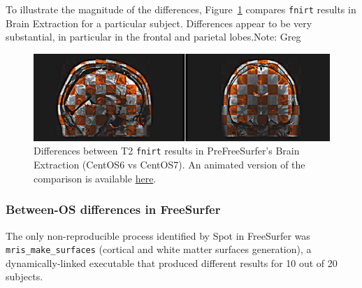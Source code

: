 \documentclass[a4paper,num-refs]{oup-contemporary}
\newcommand{\note}[2]{\color{blue}Note: #1\color{black}}
\newcommand{\toolname}[0]{Spot\xspace}
\newcommand{\fnirt}[0]{\texttt{fnirt}\xspace}
\begin{document}
To illustrate the magnitude of the differences,
Figure~\ref{fig:fnirt_result} compares \fnirt results in Brain Extraction
for a particular subject. Differences appear to be very substantial, in
particular in the frontal and parietal lobes.\note{Greg}{This is very hard to see from the figure because the
luminosity of the two colormaps are so different - the contrast moving from orange to grayscale is difficult. Perhaps use two colors, green and purple for instance, with the same intensity to see if this is more easily seen?} 
\begin{figure}
  \centering
    \includegraphics[width=\columnwidth]{figures/t2w_alignment.png} 
    \caption{Differences between T2 \fnirt results in PreFreeSurfer's Brain Extraction (CentOS6 vs 
    CentOS7). An animated version of the comparison is available \href{https://github.com/big-data-lab-team/HCP-reproducibility-paper/blob/master/figures/pfs_t2w_alignment.gif}{here}.}
    \label{fig:fnirt_result}
\end{figure}

\subsubsection{Between-OS differences in FreeSurfer} 

The only non-reproducible process identified by \toolname in FreeSurfer was
\texttt{mris\_make\_surfaces} (cortical and white matter surfaces
generation), a dynamically-linked executable 
that produced different results for
10 out of 20 subjects. 
\end{document}
